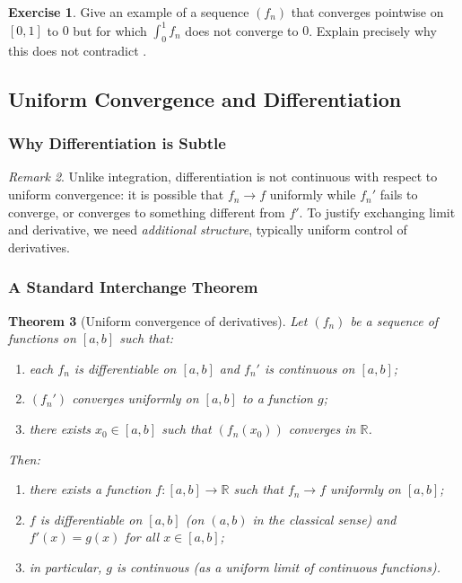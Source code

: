 \documentclass[12pt]{article}
\numberwithin{equation}{section}
\newcommand{\RR}{\mathbb{R}}
\theoremstyle{plain}
\newtheorem{theorem}{Theorem}[section]
\theoremstyle{definition}
\newtheorem{exercise}[theorem]{Exercise}
\theoremstyle{remark}
\newtheorem{remark}[theorem]{Remark}
\begin{document}
\begin{exercise}
Give an example of a sequence $(f_n)$ that converges pointwise on $[0,1]$ to $0$ but for which
$\int_0^1 f_n$ does not converge to $0$.
Explain precisely why this does not contradict .
\end{exercise}

\newpage

\subsection{Uniform Convergence and Differentiation}

\subsubsection{Why Differentiation is Subtle}

\begin{remark}
Unlike integration, differentiation is not continuous with respect to uniform convergence:
it is possible that $f_n\to f$ uniformly while $f_n'$ fails to converge, or converges to something different from $f'$.
To justify exchanging limit and derivative, we need \emph{additional structure}, typically uniform control of derivatives.
\end{remark}

\subsubsection{A Standard Interchange Theorem}

\begin{theorem}[Uniform convergence of derivatives]\label{thm:unif-deriv}
Let $(f_n)$ be a sequence of functions on $[a,b]$ such that:
\begin{enumerate}[label=(\alph*)]
\item each $f_n$ is differentiable on $[a,b]$ and $f_n'$ is continuous on $[a,b]$;
\item $(f_n')$ converges uniformly on $[a,b]$ to a function $g$;
\item there exists $x_0\in[a,b]$ such that $(f_n(x_0))$ converges in $\RR$.
\end{enumerate}
Then:
\begin{enumerate}[label=(\roman*)]
\item there exists a function $f:[a,b]\to\RR$ such that $f_n\to f$ uniformly on $[a,b]$;
\item $f$ is differentiable on $[a,b]$ (on $(a,b)$ in the classical sense) and $f'(x)=g(x)$ for all $x\in[a,b]$;
\item in particular, $g$ is continuous (as a uniform limit of continuous functions).
\end{enumerate}
\end{theorem}
\end{document}
